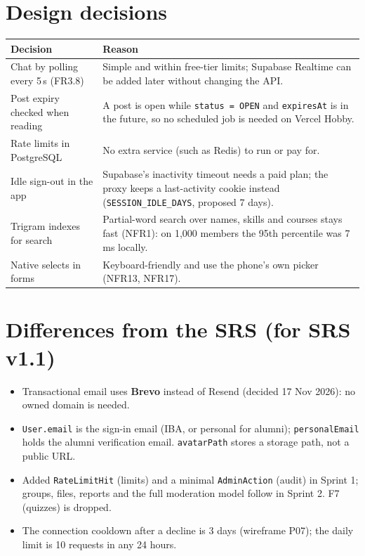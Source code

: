 \documentclass[10pt,a4paper]{article}
\begin{document}
\section{Design decisions}
\begin{tabularx}{\linewidth}{@{}>{\raggedright\arraybackslash}p{38mm} X@{}}
\toprule
\textbf{Decision} & \textbf{Reason}\\
\midrule
Chat by polling every 5\,s (FR3.8) & Simple and within free-tier limits; Supabase Realtime can be added later without changing the API.\\
Post expiry checked when reading & A post is open while \texttt{status = OPEN} and \texttt{expiresAt} is in the future, so no scheduled job is needed on Vercel Hobby.\\
Rate limits in PostgreSQL & No extra service (such as Redis) to run or pay for.\\
Idle sign-out in the app & Supabase's inactivity timeout needs a paid plan; the proxy keeps a last-activity cookie instead (\texttt{SESSION\_IDLE\_DAYS}, proposed 7 days).\\
Trigram indexes for search & Partial-word search over names, skills and courses stays fast (NFR1): on 1,000 members the 95th percentile was 7\,ms locally.\\
Native selects in forms & Keyboard-friendly and use the phone's own picker (NFR13, NFR17).\\
\bottomrule
\end{tabularx}

\section{Differences from the SRS (for SRS v1.1)}
\begin{itemize}
\item Transactional email uses \textbf{Brevo} instead of Resend (decided 17 Nov 2026): no owned domain is needed.
\item \texttt{User.email} is the sign-in email (IBA, or personal for alumni); \texttt{personalEmail} holds the alumni verification email. \texttt{avatarPath} stores a storage path, not a public URL.
\item Added \texttt{RateLimitHit} (limits) and a minimal \texttt{AdminAction} (audit) in Sprint 1; groups, files, reports and the full moderation model follow in Sprint 2. F7 (quizzes) is dropped.
\item The connection cooldown after a decline is 3 days (wireframe P07); the daily limit is 10 requests in any 24 hours.
\end{itemize}
\end{document}
